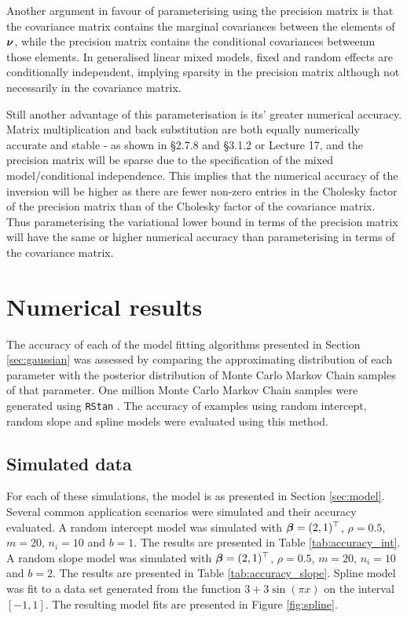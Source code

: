 Another argument in favour of parameterising using the precision matrix is that
the covariance matrix contains the marginal covariances between the elements of
${\boldsymbol \nu}$, while the precision matrix contains the conditional covariances
betweenm those elements. In generalised linear mixed models, fixed and random
effects are conditionally independent, implying sparsity in the precision
matrix although not necessarily in the covariance matrix.

Still another advantage of this parameterisation is its' greater numerical
accuracy.  Matrix multiplication and back substitution are both equally
numerically accurate and stable - as shown in \cite{Golub:1996:MC:248979}
\S2.7.8 and \S3.1.2 or \cite{trefethen97} Lecture 17, and the precision matrix
will be sparse due to the specification of the mixed model/conditional
independence. This implies that the numerical accuracy of the inversion will be
higher as there are fewer non-zero entries in the Cholesky factor of the
precision matrix than of the Cholesky factor of the covariance matrix. Thus
parameterising the variational lower bound in terms of the precision matrix
will have the same or higher numerical accuracy than parameterising in terms of
the covariance matrix.

\section{Numerical results}
\label{sec:results}
The accuracy of each of the model fitting algorithms presented in Section
\ref{sec:gaussian} was assessed by comparing the approximating distribution of
each parameter with the posterior distribution of Monte Carlo Markov Chain
samples of that parameter. One million Monte Carlo Markov Chain samples were
generated using \texttt{RStan} \cite{Carpenter2016, StanDevelopmentTeam2016}.
The accuracy of examples using random intercept, random slope and spline models
were evaluated using this method.
		
\subsection{Simulated data}
For each of these simulations, the model is as presented in Section
\ref{sec:model}. Several common application scenarios were simulated and their
accuracy evaluated. A random intercept model was simulated with ${\boldsymbol \beta} = (2,
1)^\top$, $\rho = 0.5$, $m = 20$, $n_i = 10$ and $b = 1$. The results are
presented in Table \ref{tab:accuracy_int}. A random slope model was simulated
with ${\boldsymbol \beta} = (2, 1)^\top$, $\rho = 0.5$, $m = 20$, $n_i = 10$ and $b = 2$.
The results are presented in Table \ref{tab:accuracy_slope}. Spline model was
fit to a data set generated from the function $3 + 3 \sin{(\pi x)}$ on the
interval $[-1, 1]$. The resulting model fits are presented in Figure
\ref{fig:spline}.
		
